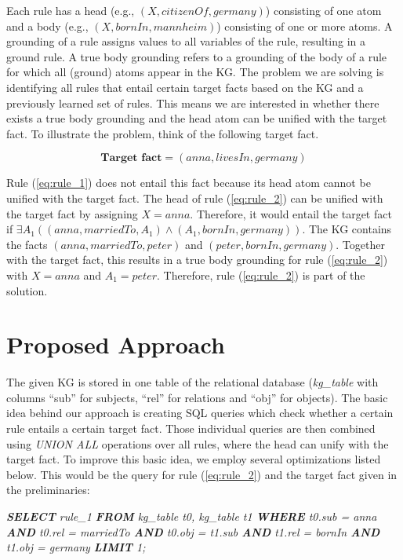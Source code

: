 \documentclass[english]{lni}
\begin{document}
Each rule has a head (e.g., \((X, citizenOf, germany)\)) consisting of one atom and a body (e.g., \((X, 
bornIn, mannheim)\)) consisting of one or more atoms. A grounding of a rule assigns values to all variables of the rule, resulting in a ground rule. A true body grounding refers to a grounding of the body of a rule for which all (ground) atoms appear in the KG. The problem we are solving is identifying all rules that entail certain target facts based on the KG and a previously learned set of rules. This means we are interested in whether there exists a true body grounding and the head atom can be unified with the target fact. To illustrate the problem, think of the following target fact.

\begin{equation*} \label{eq:target_1}
\textbf{Target fact} = (anna, livesIn, germany)
\end{equation*}


Rule (\ref{eq:rule_1}) does not entail this fact because its head atom cannot be unified with the target fact.
The head of rule (\ref{eq:rule_2}) can be unified with the target fact by assigning \(X = anna\). Therefore, it would entail the target fact if \(\exists A_1 ((anna, marriedTo, A_1) \wedge (A_1, bornIn, germany))\). The KG contains the facts \((anna, marriedTo, peter)\) and \((peter, bornIn, germany)\). Together with the target fact, this results in a true body grounding for rule (\ref{eq:rule_2}) with \(X = anna\) and \(A_1 = peter\). Therefore, rule (\ref{eq:rule_2}) is part of the solution.

\section{Proposed Approach}

The given KG is stored in one table of the relational database (\textit{kg\_table} with columns “sub” for subjects, “rel” for relations and “obj” for objects). The basic idea behind our approach is creating SQL queries which check whether a certain rule entails a certain target fact. Those individual queries are then combined using \textit{UNION ALL} operations over all rules, where the head can unify with the target fact. To improve this basic idea, we employ several optimizations listed below. This would be the query for rule (\ref{eq:rule_2}) and the target fact given in the preliminaries:

\textit{\textbf{SELECT} rule\_1 \textbf{FROM} kg\_table t0,  kg\_table t1 \textbf{WHERE} t0.sub = anna \textbf{AND} t0.rel = marriedTo \textbf{AND} t0.obj = t1.sub \textbf{AND} t1.rel = bornIn \textbf{AND} t1.obj = germany \textbf{LIMIT} 1;}
\end{document}
